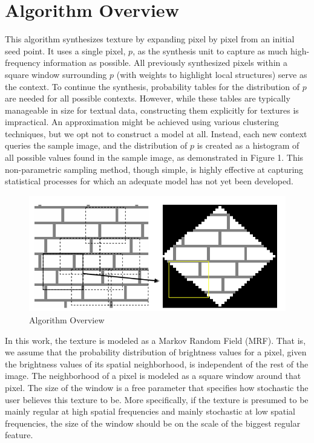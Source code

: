 \documentclass{article}
\begin{document}
\section{Algorithm Overview}
This algorithm synthesizes texture by expanding pixel by pixel from an initial seed point. It uses a single pixel, $p$, as the synthesis unit to capture as much high-frequency information as possible. All previously synthesized pixels within a square window surrounding $p$ (with weights to highlight local structures) serve as the context. To continue the synthesis, probability tables for the distribution of $p$ are needed for all possible contexts. However, while these tables are typically manageable in size for textual data, constructing them explicitly for textures is impractical. An approximation might be achieved using various clustering techniques, but we opt not to construct a model at all. Instead, each new context queries the sample image, and the distribution of $p$ is created as a histogram of all possible values found in the sample image, as demonstrated in Figure 1. This non-parametric sampling method, though simple, is highly effective at capturing statistical processes for which an adequate model has not yet been developed.

\begin{figure}[htbp!]
    \centering
    \includegraphics[scale=0.8]{Fig1.jpg}
    \caption{Algorithm Overview}
    \label{fig:enter-label}
\end{figure}

In this work, the texture is modeled as a Markov Random Field (MRF). That is, we assume that the probability distribution of brightness values for a pixel, given the brightness values of its spatial neighborhood, is independent of the rest of the image. The neighborhood of a pixel is modeled as a square window around that pixel. The size of the window is a free parameter that specifies how stochastic the user believes this texture to be. More specifically, if the texture is presumed to be mainly regular at high spatial frequencies and mainly stochastic at low spatial frequencies, the size of the window should be on the scale of the biggest regular feature. 
\end{document}
